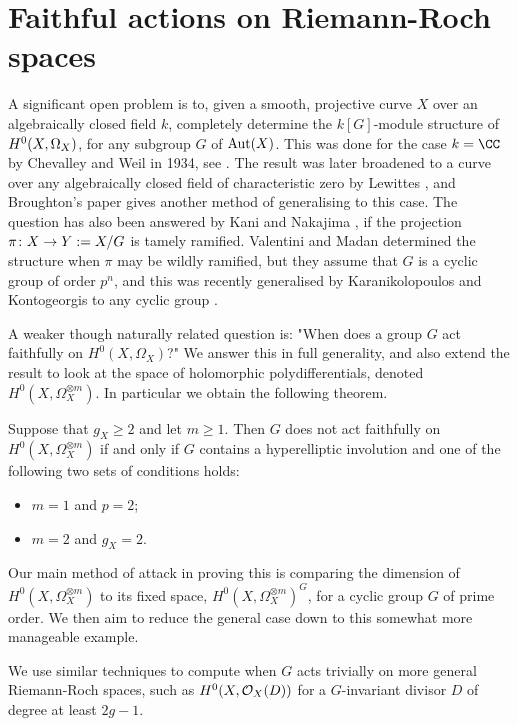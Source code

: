  \section{Faithful actions on Riemann-Roch spaces}

A significant open problem is to, given a smooth, projective curve $X$ over an algebraically closed field $k$, completely determine the $k[G]$-module structure of ${H^0(X,\Omega_X)}$, for any subgroup $G$ of $\operatorname{Aut}(X)$.
This was done for the case $k = \CC$ by Chevalley and Weil in 1934, see \cite{chev}.
The result was later broadened to a curve over any algebraically closed field of characteristic zero by Lewittes \cite{lewittes}, and Broughton's paper \cite{broughton} gives another method of generalising to this case.
The question has also been answered by Kani \cite{Kani} and Nakajima \cite{naka2}, if the projection $\pi \colon X \rightarrow Y:= X/G$ is tamely ramified.
Valentini and Madan \cite{valmadan} determined the structure when $\pi$ may be wildly ramified, but they assume that $G$ is a cyclic group of order $p^n$, and this was recently generalised by Karanikolopoulos and Kontogeorgis to any cyclic group \cite{kako}.

A weaker though naturally related question is: "When does a group $G$ act faithfully on $H^0(X,\Omega_X)$?"
We answer this in full generality, and also extend the result to look at the space of holomorphic polydifferentials, denoted $H^0(X,\Omega_X^{\otimes m})$.
In particular we obtain the following theorem.
    \begin{unnumthm}
    Suppose that $g_X\geq 2$ and let $m\geq1$. 
    Then $G$ does not act faithfully on $H^0(X,\Omega_X^{\otimes m})$ if and only if $G$ contains a hyperelliptic involution and one of the following two sets of conditions holds:\begin{itemize}
        \item $m=1$ and $p=2$;
        \item $m=2$ and $g_X=2$.
        \end{itemize}
    \end{unnumthm}
Our main method of attack in proving this is comparing the dimension of $H^0(X,\Omega_X^{\otimes m})$ to its fixed space, $H^0(X,\Omega_X^{\otimes m})^G$, for a cyclic group $G$ of prime order.
We then aim to reduce the general case down to this somewhat more manageable example.

We use similar techniques to compute when $G$ acts trivially on more general Riemann-Roch spaces, such as $H^0(X,{\cal O}_X(D))$ for a $G$-invariant divisor $D$ of degree at least $2g-1$.


